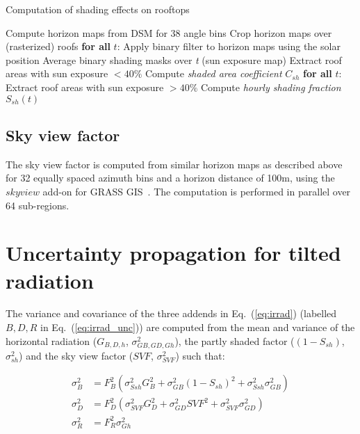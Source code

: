 \begin{algorithm}[htbp]
\caption{Computation of shading effects on rooftops}
\label{alg:shade}
\begin{algorithmic}[1]
  \footnotesize
  \State Compute horizon maps from DSM for 38 angle bins
  \State Crop horizon maps over (rasterized) roofs
  \Statex \textbf{for all} $t$:
    \State \qquad Apply binary filter to horizon maps using the solar position
  \State Average binary shading masks over \textit{t} (sun exposure map)
  \State Extract roof areas with sun exposure $< 40\%$
  \State Compute \textit{shaded area coefficient} $C_{sh}$
  \Statex \textbf{for all} $t$:
  	\State \qquad Extract roof areas with sun exposure $> 40\%$
    \State \qquad Compute \textit{hourly shading fraction} $S_{sh}(t)$
\end{algorithmic}
\end{algorithm}

\subsection*{Sky view factor}

The sky view factor is computed from similar horizon maps as described above for 32 equally spaced azimuth bins and a horizon distance of 100m, using the $skyview$ add-on for GRASS GIS~\cite{zaksek_sky-view_2011}. The computation is performed in parallel over 64 sub-regions.


\section{Uncertainty propagation for tilted radiation}
\label{unc_Gt}

The variance and covariance of the three addends in Eq.~(\ref{eq:irrad}) (labelled $B, D, R$ in Eq.~(\ref{eq:irrad_unc})) are computed from the mean and variance of the horizontal radiation ($G_{B,D,h}$, $\sigma^2_{GB,GD,Gh}$), the partly shaded factor ($(1-S_{sh})$, $\sigma^2_{sh}$) and the sky view factor ($SVF$, $\sigma^2_{SVF}$) such that:

\begin{equation}
\begin{aligned}
\sigma^2_{B} & = F_{B}^2 (\sigma^2_{Ssh} G_B^2 + \sigma^2_{GB} (1-S_{sh})^2 + \sigma^2_{Ssh} \sigma^2_{GB}) \\
\sigma^2_{D} & = F_{D}^2 (\sigma^2_{SVF} G_D^2 + \sigma^2_{GD} SVF^2 + \sigma^2_{SVF} \sigma^2_{GD}) \\
\sigma^2_{R}&  = F_{R}^2 \sigma^2_{Gh}
\end{aligned}
\end{equation}


